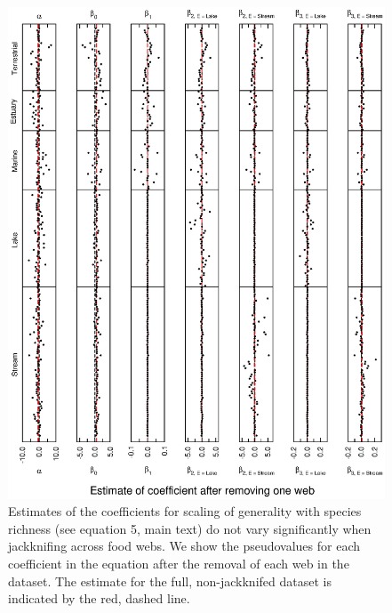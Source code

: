 \documentclass[12pt]{article}
\begin{document}
    \begin{figure}[!h]
    \centerline{\includegraphics*[height=.75\textheight]{Figures/Jackknife/Gen_web.eps}}
    \caption{Estimates of the coefficients for scaling of generality with species richness
    (see equation 5, main text) do not vary significantly
    when jackknifing across food webs. We show the pseudovalues for each coefficient
    in the equation after the removal of each web in the dataset. The estimate for the full, non-jackknifed
    dataset is indicated by the red, dashed line. }
    \label{Gen_web}
    \end{figure}

\newpage
\end{document}
